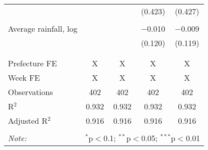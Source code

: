 \begin{table}[!htbp]
\begin{tabular}{@{\extracolsep{5pt}}lcccc}
  &  &  & (0.423) & (0.427) \\ 
  & & & & \\ 
 Average rainfall, log &  &  & $-$0.010 & $-$0.009 \\ 
  &  &  & (0.120) & (0.119) \\ 
  & & & & \\ 
\hline \\[-1.8ex] 
Prefecture FE & X & X & X & X \\ 
Week FE & X & X & X & X \\ 
Observations & 402 & 402 & 402 & 402 \\ 
R$^{2}$ & 0.932 & 0.932 & 0.932 & 0.932 \\ 
Adjusted R$^{2}$ & 0.916 & 0.916 & 0.916 & 0.916 \\ 
\hline 
\hline \\[-1.8ex] 
\textit{Note:}  & \multicolumn{4}{r}{$^{*}$p$<$0.1; $^{**}$p$<$0.05; $^{***}$p$<$0.01} \\ 
\end{tabular} 
\end{table} 
